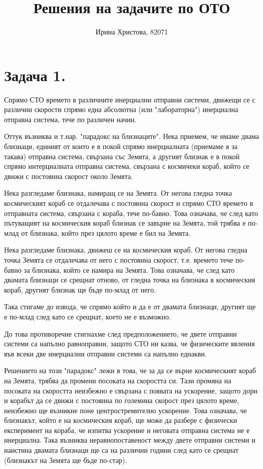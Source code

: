 \documentclass[a4paper,12pt]{article}
\title{Решения на задачите по ОТО}
\author{Ирина Христова, 82071}
\begin{document}
\maketitle
\pagebreak
\section*{Задача 1.}
Спрямо СТО времето в различните инерциални отправни системи, движещи се с 
различни скорости спрямо една абсолютна (или "лабораторна") инерциална отправна система,
тече по различен начин.

Оттук възниква и т.нар. "парадокс на близнаците". Нека приемем, че имаме двама близнаци, 
единият от които е в покой спрямо инерциалната (приемаме я за такава) отправна система, свързана
със Земята, а другият близнак е в покой спрямо интерциалната отправна система, свързана 
с космичеки кораб, който се движи с постоянна скорост около Земята.

Нека разгледаме близнака, намиращ се на Земята. От негова гледна точка
космическият кораб се отдалечава с постоянна скорост и спрямо СТО времето в отправната система, 
свързана с кораба, тече по-бавно. Това означава, че след като пътуващият на космическия кораб близнак се завърне на Земята, 
той трябва е по-млад от близнака, който през цялото време е бил на Земята.

Нека разгледаме близнака, движеш се на космическия кораб. От негова гледна точка Земята се отдалечава от него с постоянна 
скорост, т.е. времето тече по-бавно за близнака, който се намира на Земята. Това означава, че след като двамата близнаци се срещнат отново, 
от гледна точка на близнака в космическия кораб, другият близнак ще бъде по-млад от него.

Така стигаме до извода, че спрямо който и да е от двамата близнаци, другият ще е по-млад след като се срещнат, което не е възможно.

До това противоречие стигнахме след предположението, че двете отправни системи са напълно равноправни, 
защото СТО ни казва, че физическите явления във всеки две инерциални отправни системи са напълно еднакви.

Решението на този "парадокс" лежи в това, че за да се върне космическият кораб на Земята, трябва да промени посоката на скоростта си. 
Тази промяна на посоката на скоростта неизбежно е свързана с появата на ускорение, защото дори и корабът да се движи с постоянна по големина скорост през цялото време, 
неизбежно ще възникне поне центростремително ускорение. Това означава, че близнакът, който е на космическия кораб, ще може да разбере с физически експеримент на кораба, че изпитва ускорение
и неговата отправна система не е инерциална. Така възниква неравнопоставеност между 
двете отправни системи и наистина двамата близнаци ще са на различни години след като се срещнат (близнакът на Земята ще бъде по-стар).
\end{document}
